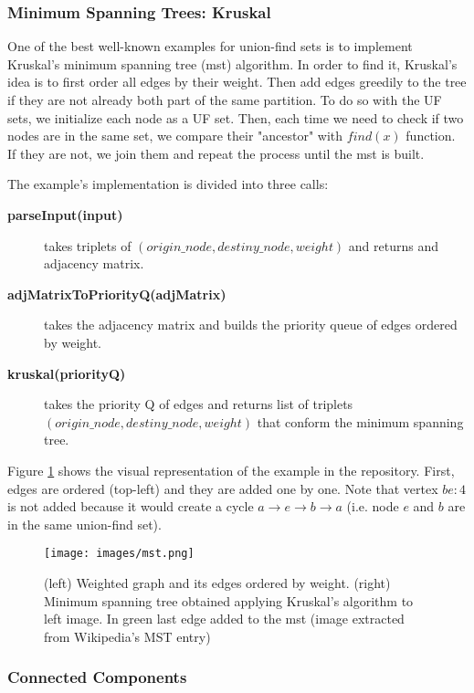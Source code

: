 \documentclass[a4paper,10pt,table,xcdraw]{article}
\begin{document}
\subsubsection{Minimum Spanning Trees: Kruskal}

One of the best well-known examples for union-find sets is to implement Kruskal's minimum spanning tree (mst) algorithm. In order to find it, Kruskal's idea is to first order all edges by their weight. Then add edges greedily to the tree if they are not already both part of the same partition. To do so with the UF sets, we initialize each node as a UF set. Then, each time we need to check if two nodes are in the same set, we compare their "ancestor" with $find(x)$ function. If they are not, we join them and repeat the process until the mst is built.

The example's implementation is divided into three calls:

\begin{description}
\item [\textbf{parseInput(input)}] takes triplets of $(origin\_node, destiny\_node, weight)$ and returns and adjacency matrix.
\item [\textbf{adjMatrixToPriorityQ(adjMatrix)}] takes the adjacency matrix and builds the priority queue of edges ordered by weight.
\item [\textbf{kruskal(priorityQ)}] takes the priority Q of edges and returns list of triplets $(origin\_node, destiny\_node, weight)$ that conform the minimum spanning tree.
\end{description}

Figure \ref{fig:mst} shows the visual representation of the example in the repository. First, edges are ordered (top-left) and they are added one by one. Note that vertex $be: 4$ is not added because it would create a cycle $a \rightarrow e \rightarrow b \rightarrow a$ (i.e. node $e$ and $b$ are in the same union-find set).

\begin{figure}[H]
\centering
\texttt{[image: images/mst.png]}
\caption{ (left) Weighted graph and its edges ordered by weight. (right) Minimum spanning tree obtained applying Kruskal's algorithm to left image. In green last edge added to the mst (image extracted from Wikipedia's MST entry)}
\label{fig:mst}
\end{figure}

\subsubsection{Connected Components}
\end{document}
